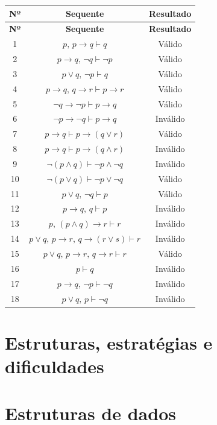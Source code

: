 \documentclass{article}
\begin{document}
\begin{center}
\small
\begin{longtable}{c c c}
\toprule
\textbf{Nº} & \textbf{Sequente} & \textbf{Resultado} \\
\midrule
\endfirsthead

\toprule
\textbf{Nº} & \textbf{Sequente} & \textbf{Resultado} \\
\midrule
\endhead

1  & $p,\, p \to q \vdash q$ & Válido \\
2  & $p \to q,\, \neg q \vdash \neg p$ & Válido \\
3  & $p \lor q,\, \neg p \vdash q$ & Válido \\
4  & $p \to q,\, q \to r \vdash p \to r$ & Válido \\
5  & $\neg q \to \neg p \vdash p \to q$ & Válido \\
6  & $\neg p \to \neg q \vdash p \to q$ & Inválido \\
7  & $p \to q \vdash p \to (q \lor r)$ & Válido \\
8  & $p \to q \vdash p \to (q \land r)$ & Inválido \\
9  & $\neg(p \land q) \vdash \neg p \land \neg q$ & Inválido \\
10 & $\neg(p \lor q) \vdash \neg p \lor \neg q$ & Válido \\
11 & $p \lor q,\, \neg q \vdash p$ & Válido \\
12 & $p \to q,\, q \vdash p$ & Inválido \\
13 & $p,\, (p \land q) \to r \vdash r$ & Inválido \\
14 & $p \lor q,\, p \to r,\, q \to (r \lor s) \vdash r$ & Inválido \\
15 & $p \lor q,\, p \to r,\, q \to r \vdash r$ & Válido \\
16 & $p \vdash q$ & Inválido \\
17 & $p \to q,\, \neg p \vdash \neg q$ & Inválido \\
18 & $p \lor q,\, p \vdash \neg q$ & Inválido \\

\bottomrule
\end{longtable}
\end{center}


\section{Estruturas, estratégias e dificuldades}

\section*{Estruturas de dados}
\end{document}
